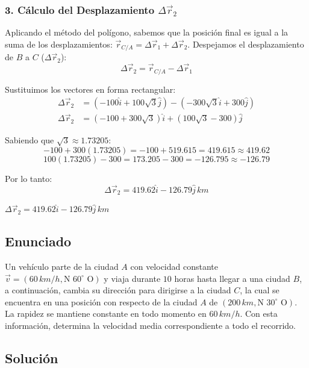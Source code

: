 \documentclass[12pt, a4paper]{article}
\begin{document}
\subsubsection*{3. Cálculo del Desplazamiento $\Delta\vec{r}_2$}
Aplicando el método del polígono, sabemos que la posición final es igual a la suma de los desplazamientos: $\vec{r}_{C/A} = \Delta\vec{r}_1 + \Delta\vec{r}_2$. 
Despejamos el desplazamiento de $B$ a $C$ ($\Delta\vec{r}_2$):
$$ \Delta\vec{r}_2 = \vec{r}_{C/A} - \Delta\vec{r}_1 $$

Sustituimos los vectores en forma rectangular:
\begin{align*}
    \Delta\vec{r}_2 &= (-100\hat{i} + 100\sqrt{3}\hat{j}) - (-300\sqrt{3}\hat{i} + 300\hat{j}) \\
    \Delta\vec{r}_2 &= (-100 + 300\sqrt{3})\hat{i} + (100\sqrt{3} - 300)\hat{j}
\end{align*}

Sabiendo que $\sqrt{3} \approx 1.73205$:
$$ -100 + 300(1.73205) = -100 + 519.615 = 419.615 \approx 419.62 $$
$$ 100(1.73205) - 300 = 173.205 - 300 = -126.795 \approx -126.79 $$

Por lo tanto:
$$ \Delta\vec{r}_2 = 419.62\hat{i} - 126.79\hat{j} \, \si{km} $$

\begin{tcolorbox}[colback=green!5!white, colframe=green!50!black, title=Respuesta Final]
\centering \Large $\Delta\vec{r}_2 = 419.62\hat{i} - 126.79\hat{j} \, \si{km}$
\end{tcolorbox}

\newpage

\subsection*{Enunciado}
Un vehículo parte de la ciudad $A$ con velocidad constante $\vec{v} = (60 \, \si{km/h}, \text{N } 60^\circ \text{ O})$ y viaja durante $10$ horas hasta llegar a una ciudad $B$, a continuación, cambia su dirección para dirigirse a la ciudad $C$, la cual se encuentra en una posición con respecto de la ciudad $A$ de $(200 \, \si{km}, \text{N } 30^\circ \text{ O})$. La rapidez se mantiene constante en todo momento en $60 \, \si{km/h}$. Con esta información, determina la velocidad media correspondiente a todo el recorrido.

\subsection*{Solución}
\end{document}
